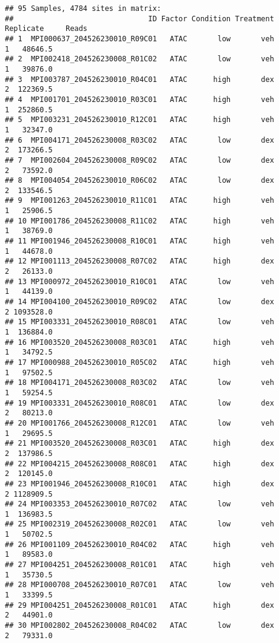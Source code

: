 \documentclass[
]{article}
\begin{document}
\begin{verbatim}
## 95 Samples, 4784 sites in matrix:
##                               ID Factor Condition Treatment Replicate     Reads
## 1  MPI000637_204526230010_R09C01   ATAC       low       veh         1   48646.5
## 2  MPI002418_204526230008_R01C02   ATAC       low       veh         1   39876.0
## 3  MPI003787_204526230010_R04C01   ATAC      high       dex         2  122369.5
## 4  MPI001701_204526230010_R03C01   ATAC      high       veh         1  252860.5
## 5  MPI003231_204526230010_R12C01   ATAC      high       veh         1   32347.0
## 6  MPI004171_204526230008_R03C02   ATAC       low       dex         2  173266.5
## 7  MPI002604_204526230008_R09C02   ATAC       low       dex         2   73592.0
## 8  MPI004054_204526230010_R06C02   ATAC       low       dex         2  133546.5
## 9  MPI001263_204526230010_R11C01   ATAC      high       veh         1   25906.5
## 10 MPI001786_204526230008_R11C02   ATAC      high       veh         1   38769.0
## 11 MPI001946_204526230008_R10C01   ATAC      high       veh         1   44678.0
## 12 MPI001113_204526230008_R07C02   ATAC      high       dex         2   26133.0
## 13 MPI000972_204526230010_R10C01   ATAC       low       veh         1   44139.0
## 14 MPI004100_204526230010_R09C02   ATAC       low       dex         2 1093528.0
## 15 MPI003331_204526230010_R08C01   ATAC       low       veh         1  136884.0
## 16 MPI003520_204526230008_R03C01   ATAC      high       veh         1   34792.5
## 17 MPI000988_204526230010_R05C02   ATAC      high       veh         1   97502.5
## 18 MPI004171_204526230008_R03C02   ATAC       low       veh         1   59254.5
## 19 MPI003331_204526230010_R08C01   ATAC       low       dex         2   80213.0
## 20 MPI001766_204526230008_R12C01   ATAC       low       veh         1   29695.5
## 21 MPI003520_204526230008_R03C01   ATAC      high       dex         2  137986.5
## 22 MPI004215_204526230008_R08C01   ATAC      high       dex         2  120145.0
## 23 MPI001946_204526230008_R10C01   ATAC      high       dex         2 1128909.5
## 24 MPI003353_204526230010_R07C02   ATAC       low       veh         1  136983.5
## 25 MPI002319_204526230008_R02C01   ATAC       low       veh         1   50702.5
## 26 MPI001109_204526230010_R04C02   ATAC      high       veh         1   89583.0
## 27 MPI004251_204526230008_R01C01   ATAC      high       veh         1   35730.5
## 28 MPI000708_204526230010_R07C01   ATAC       low       veh         1   33399.5
## 29 MPI004251_204526230008_R01C01   ATAC      high       dex         2   44901.0
## 30 MPI002802_204526230008_R04C02   ATAC       low       dex         2   79331.0

\end{verbatim}
\end{document}
